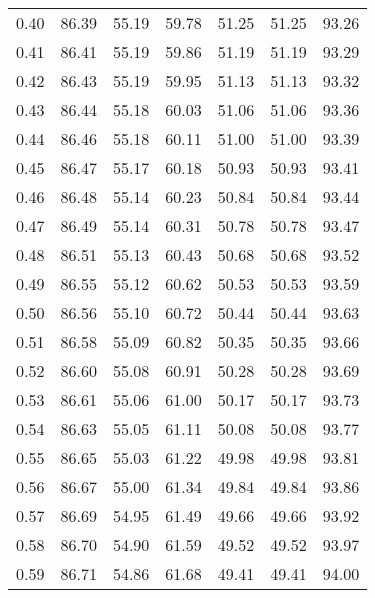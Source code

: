 \begin{tabular}{|c|c|c|c|c|c|c|}
      0.40 &     86.39 &     55.19 &      59.78 &   51.25 &      51.25 &         93.26 \\
      0.41 &     86.41 &     55.19 &      59.86 &   51.19 &      51.19 &         93.29 \\
      0.42 &     86.43 &     55.19 &      59.95 &   51.13 &      51.13 &         93.32 \\
      0.43 &     86.44 &     55.18 &      60.03 &   51.06 &      51.06 &         93.36 \\
      0.44 &     86.46 &     55.18 &      60.11 &   51.00 &      51.00 &         93.39 \\
      0.45 &     86.47 &     55.17 &      60.18 &   50.93 &      50.93 &         93.41 \\
      0.46 &     86.48 &     55.14 &      60.23 &   50.84 &      50.84 &         93.44 \\
      0.47 &     86.49 &     55.14 &      60.31 &   50.78 &      50.78 &         93.47 \\
      0.48 &     86.51 &     55.13 &      60.43 &   50.68 &      50.68 &         93.52 \\
      0.49 &     86.55 &     55.12 &      60.62 &   50.53 &      50.53 &         93.59 \\
      0.50 &     86.56 &     55.10 &      60.72 &   50.44 &      50.44 &         93.63 \\
      0.51 &     86.58 &     55.09 &      60.82 &   50.35 &      50.35 &         93.66 \\
      0.52 &     86.60 &     55.08 &      60.91 &   50.28 &      50.28 &         93.69 \\
      0.53 &     86.61 &     55.06 &      61.00 &   50.17 &      50.17 &         93.73 \\
      0.54 &     86.63 &     55.05 &      61.11 &   50.08 &      50.08 &         93.77 \\
      0.55 &     86.65 &     55.03 &      61.22 &   49.98 &      49.98 &         93.81 \\
      0.56 &     86.67 &     55.00 &      61.34 &   49.84 &      49.84 &         93.86 \\
      0.57 &     86.69 &     54.95 &      61.49 &   49.66 &      49.66 &         93.92 \\
      0.58 &     86.70 &     54.90 &      61.59 &   49.52 &      49.52 &         93.97 \\
      0.59 &     86.71 &     54.86 &      61.68 &   49.41 &      49.41 &         94.00 \\

\end{tabular}
